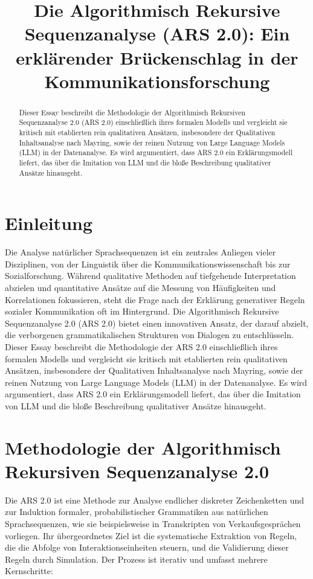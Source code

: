 \documentclass{article}
\title{Die Algorithmisch Rekursive Sequenzanalyse (ARS 2.0): Ein erklärender Brückenschlag in der Kommunikationsforschung}
\author{} %
\date{} %
\begin{document}
\maketitle

\begin{abstract}
Dieser Essay beschreibt die Methodologie der Algorithmisch Rekursiven Sequenzanalyse 2.0 (ARS 2.0) einschließlich ihres formalen Modells und vergleicht sie kritisch mit etablierten rein qualitativen Ansätzen, insbesondere der Qualitativen Inhaltsanalyse nach Mayring, sowie der reinen Nutzung von Large Language Models (LLM) in der Datenanalyse. Es wird argumentiert, dass ARS 2.0 ein Erklärungsmodell liefert, das über die Imitation von LLM und die bloße Beschreibung qualitativer Ansätze hinausgeht.
\end{abstract}

\section{Einleitung}
Die Analyse natürlicher Sprachsequenzen ist ein zentrales Anliegen vieler Disziplinen, von der Linguistik über die Kommunikationswissenschaft bis zur Sozialforschung. Während qualitative Methoden auf tiefgehende Interpretation abzielen und quantitative Ansätze auf die Messung von Häufigkeiten und Korrelationen fokussieren, steht die Frage nach der Erklärung generativer Regeln sozialer Kommunikation oft im Hintergrund. Die Algorithmisch Rekursive Sequenzanalyse 2.0 (ARS 2.0) bietet einen innovativen Ansatz, der darauf abzielt, die verborgenen grammatikalischen Strukturen von Dialogen zu entschlüsseln. Dieser Essay beschreibt die Methodologie der ARS 2.0 einschließlich ihres formalen Modells und vergleicht sie kritisch mit etablierten rein qualitativen Ansätzen, insbesondere der Qualitativen Inhaltsanalyse nach Mayring, sowie der reinen Nutzung von Large Language Models (LLM) in der Datenanalyse. Es wird argumentiert, dass ARS 2.0 ein Erklärungsmodell liefert, das über die Imitation von LLM und die bloße Beschreibung qualitativer Ansätze hinausgeht.

\section{Methodologie der Algorithmisch Rekursiven Sequenzanalyse 2.0}
Die ARS 2.0 ist eine Methode zur Analyse endlicher diskreter Zeichenketten und zur Induktion formaler, probabilistischer Grammatiken aus natürlichen Sprachsequenzen, wie sie beispielsweise in Transkripten von Verkaufsgesprächen vorliegen. Ihr übergeordnetes Ziel ist die systematische Extraktion von Regeln, die die Abfolge von Interaktionseinheiten steuern, und die Validierung dieser Regeln durch Simulation. Der Prozess ist iterativ und umfasst mehrere Kernschritte:
\end{document}
